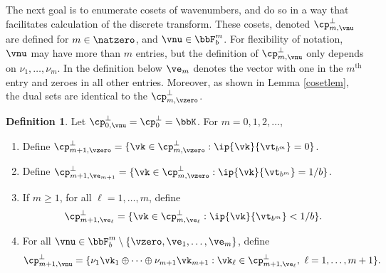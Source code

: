 \documentclass[]{elsarticle}
\theoremstyle{definition}
\newtheorem{defin}{Definition}
\begin{document}
The next goal is to enumerate cosets of wavenumbers, and do so in a way that facilitates calculation of the discrete transform.  These cosets, denoted $\cp_{m,\vnu}^{\perp}$ are defined for $m\in \natzero$, and $\vnu \in \bbF_b^m$.  For flexibility of notation, $\vnu$ may have more than $m$ entries, but the definition of $\cp_{m,\vnu}^{\perp}$ only depends on $\nu_1, \ldots, \nu_m$. In the definition below $\ve_m$ denotes the vector with one in the $m^{\text{th}}$ entry and zeroes in all other entries.  Moreover, as shown in Lemma \ref{cosetlem}, the dual sets are identical to the $\cp_{m,\vzero}^{\perp}$.

\begin{defin} \label{noodefalgo} Let $\cp_{0,\vnu}^{\perp}=\cp_{0}^{\perp}=\bbK$.  For $m=0, 1, 2, \ldots$, 
\begin{enumerate}
\renewcommand{\labelenumi}{\alph{enumi})}
\item Define $\cp_{m+1,\vzero}^{\perp}=\{\vk \in \cp_{m,\vzero}^{\perp} : \ip{\vk}{\vt_{b^{m}}}=0\}$.
\item Define $\cp_{m+1,\ve_{m+1}}^{\perp}=\{\vk \in \cp_{m,\vzero}^{\perp} : \ip{\vk}{\vt_{b^{m}}}=1/b\}$.  
\item If $m\ge 1$, for all $\ell=1, \ldots, m$, define 
\[
\cp_{m+1,\ve_{\ell}}^{\perp}=\{\vk \in \cp_{m,\ve_\ell}^{\perp} : \ip{\vk}{\vt_{b^{m}}}<1/b\}.
\]
\item For all $\vnu \in \bbF_b^m \setminus \{\vzero, \ve_1, \ldots, \ve_m\}$, define 
\[
\cp_{m+1,\vnu}^{\perp}= \{\nu_1\vk_1 \oplus \cdots \oplus \nu_{m+1} \vk_{m+1}  : \vk_\ell \in \cp_{m+1,\ve_{\ell}}^{\perp},\  \ell=1, \ldots, m+1\}.
\]
\end{enumerate}
\end{defin}
\end{document}
